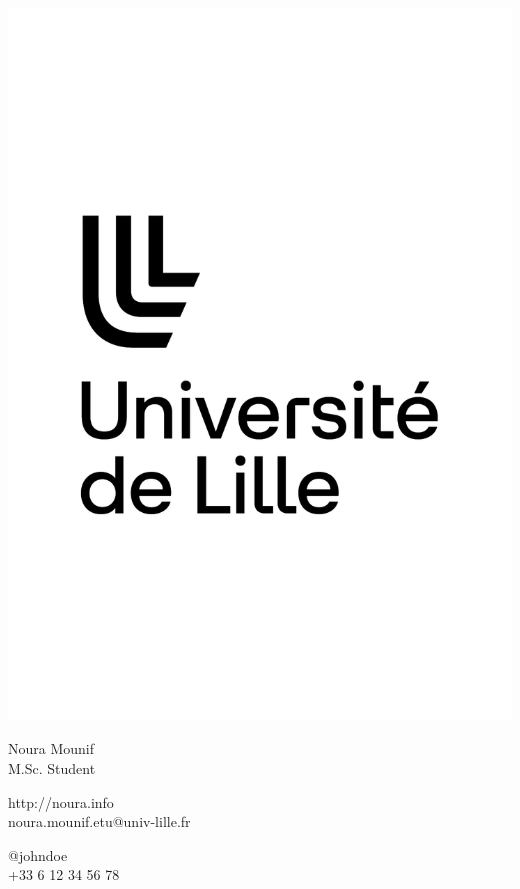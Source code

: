\documentclass{article}
\begin{document}
\centering \includegraphics[width=.25\linewidth]{logo}\\[5pt]
\parbox{2in}{\Large \centering Noura Mounif\\[1pt]
\normalsize M.Sc. Student}

\vfill
\raggedright
\begin{multicols}{2}
http://noura.info\\
noura.mounif.etu@univ-lille.fr

\columnbreak
\raggedleft
@johndoe\\
+33 6 12 34 56 78%
\end{multicols}%
\end{document}
